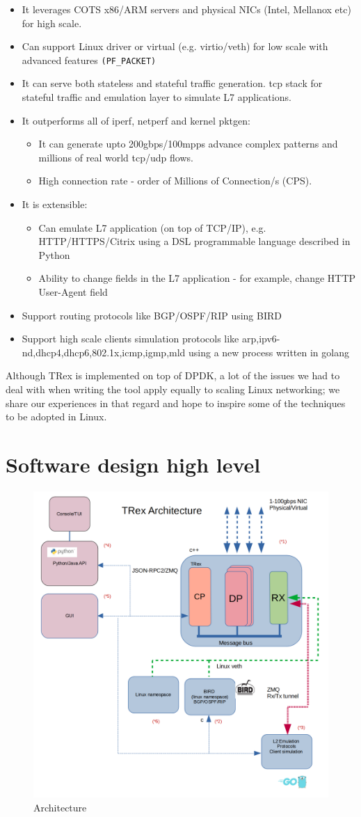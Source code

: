 \documentclass[letterpaper]{article}
\begin{document}
\begin{itemize}
\item It leverages COTS x86/ARM servers and physical NICs (Intel, Mellanox etc) for high scale.
\item Can support Linux driver or virtual (e.g. virtio/veth) for low scale with advanced features \texttt{(PF\_PACKET)}
\item It can serve both stateless and stateful traffic generation.
tcp stack for stateful traffic and emulation layer to simulate L7 applications.
\item It outperforms all of iperf, netperf and kernel pktgen: 
\begin{itemize}
    \item It can generate upto 200gbps/100mpps advance complex patterns and millions of real
    world tcp/udp flows.
    \item High connection rate - order of Millions of Connection/s (CPS).
\end{itemize}
\item It is extensible:
\begin{itemize}
    \item Can emulate L7 application (on top of TCP/IP),
    e.g. HTTP/HTTPS/Citrix using a DSL programmable language described in Python 
    \item Ability to change fields in the L7 application - for example,
    change HTTP User-Agent field
\end{itemize}
\item Support routing protocols like BGP/OSPF/RIP using BIRD \cite{b4}
\item Support high scale clients simulation protocols like arp,ipv6-nd,dhcp4,dhcp6,802.1x,icmp,igmp,mld using a new process written in golang 
\end{itemize}
Although TRex is implemented on top of DPDK, a lot of the issues we had
to deal with when writing the tool apply equally to scaling Linux networking;
we share our experiences in that regard and hope to inspire some
of the techniques to be adopted in Linux.

\section{Software design high level}

\begin{figure}[h]
\includegraphics[width=0.4
\textwidth, center]{trex_arch_2.png}
\caption{Architecture}
\label{fig:arch}
\end{figure}
\end{document}
